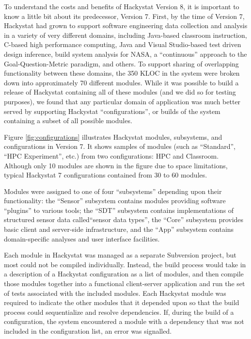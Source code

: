 \documentclass[conference,compsoc]{IEEEtran}
\begin{document}
To understand the costs and benefits of Hackystat Version 8, it is
important to know a little bit about its predecessor, Version 7.  First, by
the time of Version 7, Hackystat had grown to support software engineering data
collection and analysis in a variety of very different domains, including
Java-based classroom instruction, C-based high performance computing, Java
and Visual Studio-based test driven design inference, build system analysis
for NASA, a ``continuous'' approach to the Goal-Question-Metric paradigm,
and others.  To support sharing of overlapping functionality between these
domains, the 350 KLOC in the system were broken down into approximately 70
different modules.  While it was possible to build a release of Hackystat
containing all of these modules (and we did so for testing purposes), we
found that any particular domain of application was much better served by
supporting Hackystat ``configurations'', or builds of the system containing
a subset of all possible modules.

Figure \ref{fig:configurations} illustrates Hackystat modules, subsystems,
and configurations in Version 7.  It shows samples of modules (such as
``Standard'', ``HPC Experiment'', etc.) from two configurations: HPC and
Classroom.  Although only 10 modules are shown in the figure due to space
limitations, typical Hackystat 7 configurations contained from 30 to 60
modules.


Modules were assigned to one of four ``subsystems'' depending upon their
functionality: the ``Sensor'' subsystem contains modules providing software
``plugins'' to various tools; the ``SDT'' subsystem contains
implementations of structured sensor data called``sensor data types'', the
``Core'' subsystem provides basic client and server-side infrastructure,
and the ``App'' subsystem contains domain-specific analyses and user
interface facilities.


Each module in Hackystat was managed as a separate Subversion project, but
most could not be compiled individually. Instead, the build process would
take in a description of a Hackystat configuration as a list of modules,
and then compile those modules together into a functional client-server
application and run the set of tests associated with the included modules.
Each Hackystat module was required to indicate the other modules that it
depended upon so that the build process could sequentialize and resolve
dependencies.  If, during the build of a configuration, the system
encountered a module with a dependency that was not included in the
configuration list, an error was signalled.
\end{document}
